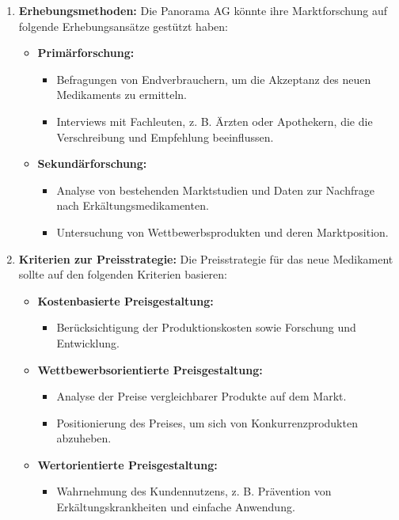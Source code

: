 {\begin{enumerate}[label=(\alph*)]
    \item \textbf{Erhebungsmethoden:}
    Die Panorama AG könnte ihre Marktforschung auf folgende Erhebungsansätze gestützt haben:
    \begin{itemize}
        \item \textbf{Primärforschung:}
        \begin{itemize}
            \item Befragungen von Endverbrauchern, um die Akzeptanz des neuen Medikaments zu ermitteln.
            \item Interviews mit Fachleuten, z. B. Ärzten oder Apothekern, die die Verschreibung und Empfehlung beeinflussen.
        \end{itemize}
        \item \textbf{Sekundärforschung:}
        \begin{itemize}
            \item Analyse von bestehenden Marktstudien und Daten zur Nachfrage nach Erkältungsmedikamenten.
            \item Untersuchung von Wettbewerbsprodukten und deren Marktposition.
        \end{itemize}
    \end{itemize}

    \item \textbf{Kriterien zur Preisstrategie:}
    Die Preisstrategie für das neue Medikament sollte auf den folgenden Kriterien basieren:
    \begin{itemize}
        \item \textbf{Kostenbasierte Preisgestaltung:}
        \begin{itemize}
            \item Berücksichtigung der Produktionskosten sowie Forschung und Entwicklung.
        \end{itemize}
        \item \textbf{Wettbewerbsorientierte Preisgestaltung:}
        \begin{itemize}
            \item Analyse der Preise vergleichbarer Produkte auf dem Markt.
            \item Positionierung des Preises, um sich von Konkurrenzprodukten abzuheben.
        \end{itemize}
        \item \textbf{Wertorientierte Preisgestaltung:}
        \begin{itemize}
            \item Wahrnehmung des Kundennutzens, z. B. Prävention von Erkältungskrankheiten und einfache Anwendung.
        \end{itemize}
    \end{itemize}
\end{enumerate}
}

